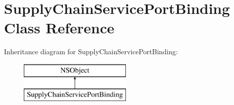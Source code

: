 \hypertarget{interface_supply_chain_service_port_binding}{}\section{Supply\+Chain\+Service\+Port\+Binding Class Reference}
\label{interface_supply_chain_service_port_binding}
Inheritance diagram for Supply\+Chain\+Service\+Port\+Binding\+:\begin{figure}[H]
\begin{center}
\leavevmode
\includegraphics[height=2.000000cm]{interface_supply_chain_service_port_binding}
\end{center}
\end{figure}
